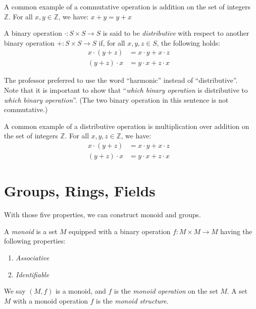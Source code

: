 \documentclass[
	11pt, %
	fleqn, %
	a4paper, %
]{LegrandOrangeBook}
\begin{document}
\begin{example}
    A common example of a commutative operation is addition on the set of integers $\mathbb{Z}$. For all $x,y \in \mathbb{Z}$, we have: $x + y = y + x$
\end{example}

\begin{definition}
    A binary operation $\cdot: S \times S \to S$ is said to be \emph{distributive} with respect to another binary operation $+: S \times S \to S$ if, for all $x,y,z \in S$, the following holds:
    \[ \begin{split}
        x \cdot (y + z) &= x \cdot y + x \cdot z \\
        (y + z) \cdot x &= y \cdot x + z \cdot x
    \end{split} \]
\end{definition}

The professor preferred to use the word ``harmonic'' instead of ``distributive''. Note that it is important to show that ``\emph{which binary operation} is distributive to \emph{which binary operation}''. (The two binary operation in this sentence is not commutative.)

\begin{example}
    A common example of a distributive operation is multiplication over addition on the set of integers $\mathbb{Z}$. For all $x,y,z \in \mathbb{Z}$, we have:
    \[ \begin{split}
        x \cdot (y + z) &= x \cdot y + x \cdot z \\
        (y + z) \cdot x &= y \cdot x + z \cdot x
    \end{split} \]
\end{example}

\newpage

\section{Groups, Rings, Fields}

With those five properties, we can construct monoid and groups.

\begin{definition}[Monoid]
    A \emph{monoid} is a set $M$ equipped with a binary operation $f: M \times M \to M$ having the following properties:
    \begin{enumerate}
        \item \emph{Associative}
        \item \emph{Identifiable}
    \end{enumerate}
    We say $(M, f)$ is a monoid, and $f$ is the \emph{monoid operation} on the set $M$. A set $M$ with a monoid operation $f$ is the \emph{monoid structure}.
\end{definition}
\end{document}
